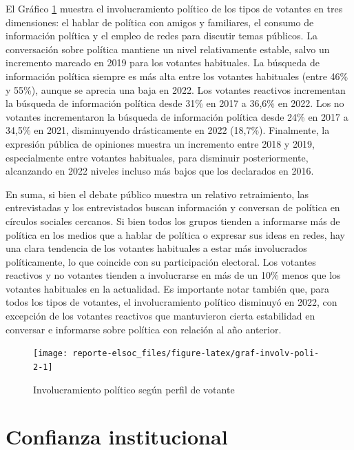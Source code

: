 \documentclass[
  12pt,
]{book}
\begin{document}
El Gráfico \ref{fig:graf-involv-poli-2} muestra el involucramiento político de los tipos de votantes en tres dimensiones: el hablar de política con amigos y familiares, el consumo de información política y el empleo de redes para discutir temas públicos. La conversación sobre política mantiene un nivel relativamente estable, salvo un incremento marcado en 2019 para los votantes habituales. La búsqueda de información política siempre es más alta entre los votantes habituales (entre 46\% y 55\%), aunque se aprecia una baja en 2022. Los votantes reactivos incrementan la búsqueda de información política desde 31\% en 2017 a 36,6\% en 2022. Los no votantes incrementaron la búsqueda de información política desde 24\% en 2017 a 34,5\% en 2021, disminuyendo drásticamente en 2022 (18,7\%). Finalmente, la expresión pública de opiniones muestra un incremento entre 2018 y 2019, especialmente entre votantes habituales, para disminuir posteriormente, alcanzando en 2022 niveles incluso más bajos que los declarados en 2016.

En suma, si bien el debate público muestra un relativo retraimiento, las entrevistadas y los entrevistados buscan información y conversan de política en círculos sociales cercanos. Si bien todos los grupos tienden a informarse más de política en los medios que a hablar de política o expresar sus ideas en redes, hay una clara tendencia de los votantes habituales a estar más involucrados políticamente, lo que coincide con su participación electoral. Los votantes reactivos y no votantes tienden a involucrarse en más de un 10\% menos que los votantes habituales en la actualidad. Es importante notar también que, para todos los tipos de votantes, el involucramiento político disminuyó en 2022, con excepción de los votantes reactivos que mantuvieron cierta estabilidad en conversar e informarse sobre política con relación al año anterior.

\begin{figure}

{\centering \texttt{[image: reporte-elsoc\_files/figure-latex/graf-involv-poli-2-1]} 

}

\caption{Involucramiento político según perfil de votante}\label{fig:graf-involv-poli-2}
\end{figure}

\hypertarget{confianza-institucional}{%
\section{Confianza institucional}\label{confianza-institucional}}
\end{document}
